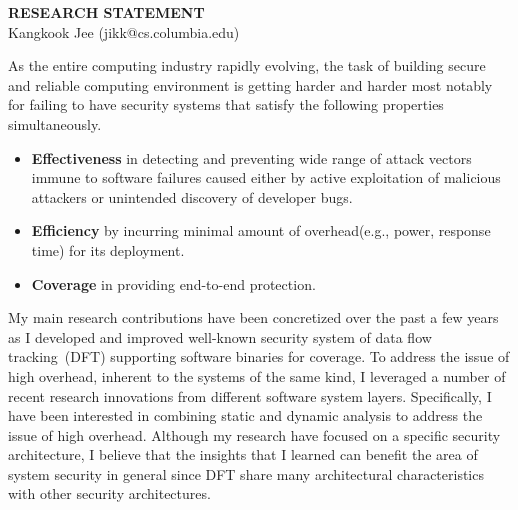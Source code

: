 \documentclass[letterpaper, 10pt]{article}
\begin{document}
\begin{small}

\begin{center}
{\LARGE \bf RESEARCH STATEMENT}\\
\vspace*{0.1cm}
{\normalsize Kangkook Jee (jikk@cs.columbia.edu)}
\end{center}



As the entire computing industry rapidly evolving, the task of building secure
and  reliable computing environment is getting harder and harder most notably
for failing to have security systems that satisfy the following properties
simultaneously.

\begin{itemize}

        \item {\bf Effectiveness} in detecting and preventing wide range of
                attack vectors immune to software failures caused either by
                active exploitation of malicious attackers or unintended
                discovery of developer bugs.

        \item {\bf Efficiency} by incurring minimal amount of overhead(e.g.,
                power, response time) for its deployment.

        \item {\bf Coverage} in providing end-to-end protection.  

\end{itemize}


My main research contributions have been concretized over the past a few years
as I developed and improved well-known security system of data flow
tracking~(DFT) supporting software binaries for coverage.
%
To address the issue of high overhead, inherent to the systems of the same
kind, I leveraged a number of recent research innovations from different
software system layers. Specifically, I have been interested in combining
static and dynamic analysis to address the issue of high overhead.
%
Although my research have focused on a specific security architecture, I
believe that the insights that I learned can benefit the area of system
security in general since DFT share many architectural characteristics with
other security architectures.


\end{small}
\end{document}

